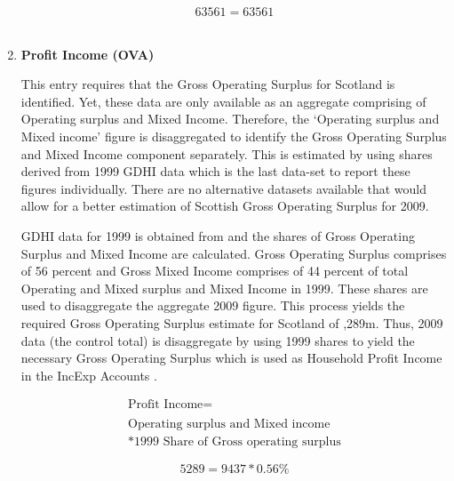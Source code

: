 \begin{enumerate}
\begin{equation} \nonumber
63561 = 63561
\end{equation}\\

\newpage

\item \textbf {Profit Income (OVA)}

\bigskip

This entry requires that the Gross Operating Surplus for Scotland is identified. Yet, these data are only available as an aggregate comprising of Operating surplus and Mixed Income. Therefore, the `Operating surplus and Mixed income' figure is disaggregated to identify the Gross Operating Surplus and Mixed Income component separately. This is estimated by using shares derived from 1999 GDHI data which is the last data-set to report these figures individually. There are no alternative datasets available that would allow for a better estimation of Scottish Gross Operating Surplus for 2009.

\bigskip

GDHI data for 1999 is obtained from  and the shares of Gross Operating Surplus and Mixed Income are calculated. Gross Operating Surplus comprises of 56 percent and Gross Mixed Income comprises of 44 percent of total Operating and Mixed surplus and Mixed Income in 1999. These shares are used to disaggregate the aggregate 2009 figure. This process yields the required Gross Operating Surplus estimate for Scotland of ,289m. Thus, 2009 data (the control total) is disaggregate by using 1999 shares to yield the necessary Gross Operating Surplus which is used as Household Profit Income in the IncExp Accounts \cite{ONS2011b}.

\begin{equation}
\begin{split}
\text{Profit Income} = \\ \\
\text{Operating surplus and Mixed income} \\
* \text{1999 Share of Gross operating surplus}
\end{split} \label{eq:2.5.3}
\end{equation}

\begin{equation} \nonumber
5289 = 9437 * 0.56\%
\end{equation}\\


\newpage


\end{enumerate}
